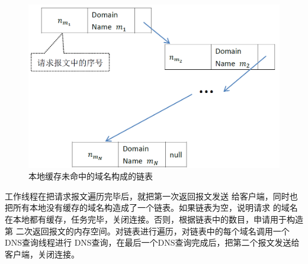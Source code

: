 \begin{figure}[H]
\centering
\includegraphics[keepaspectratio, scale=0.5]{pitures/response2_dns_list.png}
\caption{本地缓存未命中的域名构成的链表} 
\end{figure}

\par{工作线程在把请求报文遍历完毕后，就把第一次返回报文发送
给客户端，同时也把所有本地没有缓存的域名构造成了一个链表。如果链表为空，说明请求
的域名在本地都有缓存，任务完毕，关闭连接。否则，根据链表中的数目，申请用于构造第
二次返回报文的内存空间。对链表进行遍历，对链表中的每个域名调用一个DNS查询线程进行
DNS查询，在最后一个DNS查询完成后，把第二个报文发送给客户端，关闭连接。}

